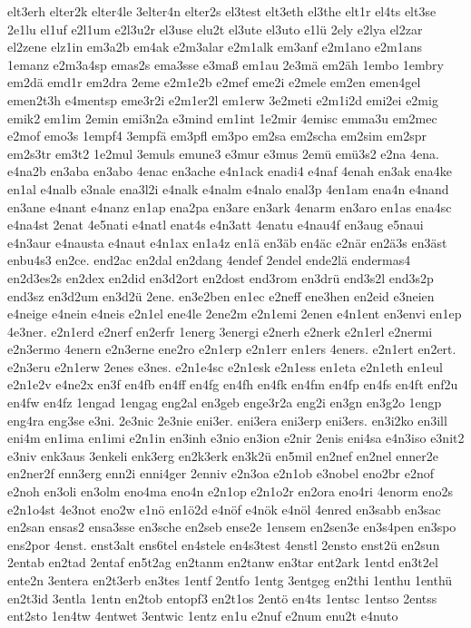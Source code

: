{elt3erh
elter2k
elter4le
3elter4n
elter2s
el3test
elt3eth
el3the
elt1r
el4ts
elt3se
2e1lu
el1uf
e2l1um
e2l3u2r
el3use
elu2t
el3ute
el3uto
e1lü
2ely
e2lya
el2zar
el2zene
elz1in
em3a2b
em4ak
e2m3alar
e2m1alk
em3anf
e2m1ano
e2m1ans
1emanz
e2m3a4sp
emas2s
ema3sse
e3maß
em1au
2e3mä
em2äh
1embo
1embry
em2dä
emd1r
em2dra
2eme
e2m1e2b
e2mef
eme2i
e2mele
em2en
emen4gel
emen2t3h
e4mentsp
eme3r2i
e2m1er2l
em1erw
3e2meti
e2m1i2d
emi2ei
e2mig
emik2
em1im
2emin
emi3n2a
e3mind
em1int
1e2mir
4emisc
emma3u
em2mec
e2mof
emo3s
1empf4
3empfä
em3pfl
em3po
em2sa
em2scha
em2sim
em2spr
em2s3tr
em3t2
1e2mul
3emuls
emune3
e3mur
e3mus
2emü
emü3s2
e2na
4ena.
e4na2b
en3aba
en3abo
4enac
en3ache
e4n1ack
enadi4
e4naf
4enah
en3ak
ena4ke
en1al
e4nalb
e3nale
ena3l2i
e4nalk
e4nalm
e4nalo
enal3p
4en1am
ena4n
e4nand
en3ane
e4nant
e4nanz
en1ap
ena2pa
en3are
en3ark
4enarm
en3aro
en1as
ena4sc
e4na4st
2enat
4e5nati
e4natl
enat4s
e4n3att
4enatu
e4nau4f
en3aug
e5naui
e4n3aur
e4nausta
e4naut
e4n1ax
en1a4z
en1ä
en3äb
en4äc
e2när
en2ä3s
en3äst
enbu4s3
en2ce.
end2ac
en2dal
en2dang
4endef
2endel
ende2lä
endermas4
en2d3es2s
en2dex
en2did
en3d2ort
en2dost
end3rom
en3drü
end3s2l
end3s2p
end3sz
en3d2um
en3d2ü
2ene.
en3e2ben
en1ec
e2neff
ene3hen
en2eid
e3neien
e4neige
e4nein
e4neis
e2n1el
ene4le
2ene2m
e2n1emi
2enen
e4n1ent
en3envi
en1ep
4e3ner.
e2n1erd
e2nerf
en2erfr
1energ
3energi
e2nerh
e2nerk
e2n1erl
e2nermi
e2n3ermo
4enern
e2n3erne
ene2ro
e2n1erp
e2n1err
en1ers
4eners.
e2n1ert
en2ert.
e2n3eru
e2n1erw
2enes
e3nes.
e2n1e4sc
e2n1esk
e2n1ess
en1eta
e2n1eth
en1eul
e2n1e2v
e4ne2x
en3f
en4fb
en4ff
en4fg
en4fh
en4fk
en4fm
en4fp
en4fs
en4ft
enf2u
en4fw
en4fz
1engad
1engag
eng2al
en3geb
enge3r2a
eng2i
en3gn
en3g2o
1engp
eng4ra
eng3se
e3ni.
2e3nic
2e3nie
eni3er.
eni3era
eni3erp
eni3ers.
en3i2ko
en3ill
eni4m
en1ima
en1imi
e2n1in
en3inh
e3nio
en3ion
e2nir
2enis
eni4sa
e4n3iso
e3nit2
e3niv
enk3aus
3enkeli
enk3erg
en2k3erk
en3k2ü
en5mil
en2nef
en2nel
enner2e
en2ner2f
enn3erg
enn2i
enni4ger
2enniv
e2n3oa
e2n1ob
e3nobel
eno2br
e2nof
e2noh
en3oli
en3olm
eno4ma
eno4n
e2n1op
e2n1o2r
en2ora
eno4ri
4enorm
eno2s
e2n1o4st
4e3not
eno2w
e1nö
en1ö2d
e4nöf
e4nök
e4nöl
4enred
en3sabb
en3sac
en2san
ensas2
ensa3sse
en3sche
en2seb
ense2e
1ensem
en2sen3e
en3s4pen
en3spo
ens2por
4enst.
enst3alt
ens6tel
en4stele
en4s3test
4enstl
2ensto
enst2ü
en2sun
2entab
en2tad
2entaf
en5t2ag
en2tanm
en2tanw
en3tar
ent2ark
1entd
en3t2el
ente2n
3entera
en2t3erb
en3tes
1entf
2entfo
1entg
3entgeg
en2thi
1enthu
1enthü
en2t3id
3entla
1entn
en2tob
entopf3
en2t1os
2entö
en4ts
1entsc
1entso
2entss
ent2sto
1en4tw
4entwet
3entwic
1entz
en1u
e2nuf
e2num
enu2t
e4nuto
}
